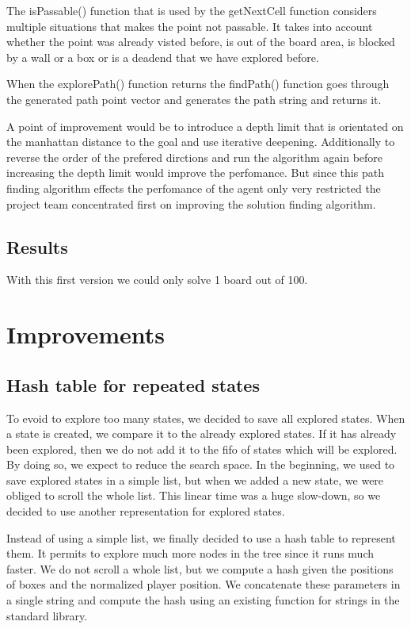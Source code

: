 \documentclass[a4paper,10pt]{article}
\begin{document}
	The isPassable() function that is used by the getNextCell function considers multiple situations that makes the point not 		passable. It takes into account whether the point was already visted before, is out of the board area, is blocked by a wall 		or a box or is a deadend that we have explored before.

	When the explorePath() function returns the findPath() function goes through the generated path point vector and generates 		the path string and returns it.

	A point of improvement would be to introduce a depth limit that is orientated on the manhattan distance to the goal and use 		iterative deepening. Additionally to reverse the order of the prefered dirctions and run the algorithm again before 		increasing the depth limit would improve the perfomance. But since this path finding algorithm effects the perfomance of the 		agent only very restricted the project team concentrated first on improving the solution finding algorithm.

	\subsection{Results}
	With this first version we could only solve 1 board out of 100. 

\section{Improvements}
    \subsection{Hash table for repeated states}
    To evoid to explore too many states, we decided to save all explored states. 
    When a state is created, we compare it to the already explored states. 
    If it has already been explored, then we do not add it to the fifo of states which will be explored. 
    By doing so, we expect to reduce the search space. 
    In the beginning, we used to save explored states in a simple list, but when we added a new state, we were obliged to scroll the whole list. 
    This linear time was a huge slow-down, so we decided to use another representation for explored states.
    
    Instead of using a simple list, we finally decided to use a hash table to represent them. 
    It permits to explore much more nodes in the tree since it runs much faster. 
    We do not scroll a whole list, but we compute a hash given the positions of boxes and the normalized player position. 
    We concatenate these parameters in a single string and compute the hash using an existing function for strings in the standard library.
\end{document}
